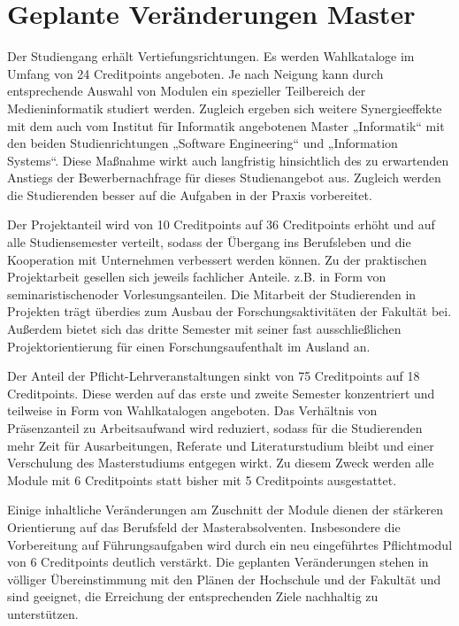 \section{Geplante Veränderungen
Master}\label{geplante-veruxe4nderungen-master}

Der Studiengang erhält Vertiefungsrichtungen. Es werden Wahlkataloge im
Umfang von 24 Creditpoints angeboten. Je nach Neigung kann durch
entsprechende Auswahl von Modulen ein spezieller Teilbereich der
Medieninformatik studiert werden. Zugleich ergeben sich weitere
Synergieeffekte mit dem auch vom Institut für Informatik angebotenen
Master „Informatik`` mit den beiden Studienrichtungen „Software
Engineering`` und „Information Systems``. Diese Maßnahme wirkt auch
langfristig hinsichtlich des zu erwartenden Anstiegs der
Bewerbernachfrage für dieses Studienangebot aus. Zugleich werden die
Studierenden besser auf die Aufgaben in der Praxis vorbereitet.

Der Projektanteil wird von 10 Creditpoints auf 36 Creditpoints erhöht
und auf alle Studiensemester verteilt, sodass der Übergang ins
Berufsleben und die Kooperation mit Unternehmen verbessert werden
können. Zu der praktischen Projektarbeit gesellen sich jeweils
fachlicher Anteile. z.B. in Form von seminaristischenoder
Vorlesungsanteilen. Die Mitarbeit der Studierenden in Projekten trägt
überdies zum Ausbau der Forschungsaktivitäten der Fakultät bei. Außerdem
bietet sich das dritte Semester mit seiner fast ausschließlichen
Projektorientierung für einen Forschungsaufenthalt im Ausland an.

Der Anteil der Pflicht-Lehrveranstaltungen sinkt von 75 Creditpoints auf
18 Creditpoints. Diese werden auf das erste und zweite Semester
konzentriert und teilweise in Form von Wahlkatalogen angeboten. Das
Verhältnis von Präsenzanteil zu Arbeitsaufwand wird reduziert, sodass
für die Studierenden mehr Zeit für Ausarbeitungen, Referate und
Literaturstudium bleibt und einer Verschulung des Masterstudiums
entgegen wirkt. Zu diesem Zweck werden alle Module mit 6 Creditpoints
statt bisher mit 5 Creditpoints ausgestattet.

Einige inhaltliche Veränderungen am Zuschnitt der Module dienen der
stärkeren Orientierung auf das Berufsfeld der Masterabsolventen.
Insbesondere die Vorbereitung auf Führungsaufgaben wird durch ein neu
eingeführtes Pflichtmodul von 6 Creditpoints deutlich verstärkt. Die
geplanten Veränderungen stehen in völliger Übereinstimmung mit den
Plänen der Hochschule und der Fakultät und sind geeignet, die Erreichung
der entsprechenden Ziele nachhaltig zu unterstützen.

